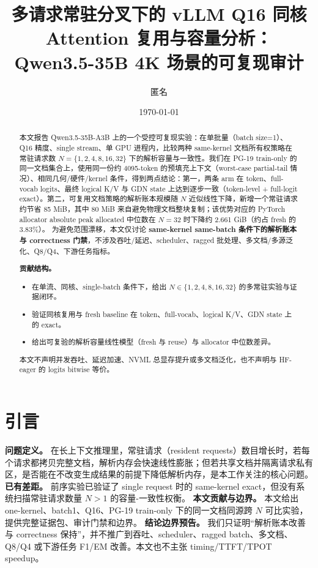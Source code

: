 \documentclass[11pt]{article}
\title{多请求常驻分叉下的 vLLM Q16 同核 Attention 复用与容量分析：\\
Qwen3.5-35B 4K 场景的可复现审计}
\author{匿名}
\date{\today}
\begin{document}
\maketitle

\begin{abstract}
本文报告 Qwen3.5-35B-A3B 上的一个受控可复现实验：在单批量（batch size=1）、Q16 精度、single stream、单 GPU 进程内，比较两种 same-kernel 文档所有权策略在常驻请求数
$N=\{1,2,4,8,16,32\}$ 下的解析容量与一致性。我们在 PG-19 train-only 的同一文档集合上，使用同一份约 4095-token 的预填充上下文（worst-case partial-tail 情况）、相同几何/硬件/kernel 条件，得到两点结论：第一，两条 arm 在 token、full-vocab logits、最终 logical K/V 与 GDN state 上达到逐步一致（token-level + full-logit exact）。第二，可复用文档策略的解析账本规模随 $N$ 近似线性下降，新增一个常驻请求约节省 85 MiB，其中 80 MiB 来自避免物理文档整块复制；该优势对应的 PyTorch allocator absolute peak allocated 中位数在 $N=32$ 时下降约 2.661 GiB（约占 fresh 的 3.83\%）。  
为避免范围漂移，本文仅讨论 \textbf{same-kernel same-batch 条件下的解析账本与 correctness 门禁}，不涉及吞吐/延迟、scheduler、ragged 批处理、多文档/多源泛化、Q8/Q4、下游任务指标。

\textbf{贡献结构。}
\begin{itemize}
  \item 在单流、同核、single-batch 条件下，给出 $N\in\{1,2,4,8,16,32\}$ 的多常驻实验与证据闭环。
  \item 验证同核复用与 fresh baseline 在 token、full-vocab、logical K/V、GDN state 上的 exact。
  \item 给出可复验的解析容量线性模型（fresh 与 reuse）与 allocator 中位数差异。
\end{itemize}
本文不声明并发吞吐、延迟加速、NVML 总显存提升或多文档泛化，也不声明与 HF-eager 的 logits bitwise 等价。
\end{abstract}

\section{引言}
\textbf{问题定义。} 在长上下文推理里，常驻请求（resident requests）数目增长时，若每个请求都拷贝完整文档，解析内存会快速线性膨胀；但若共享文档并隔离请求私有区，是否能在不改变生成结果的前提下降低解析内存，是本工作关注的核心问题。  
\textbf{已有差距。} 前序实验已验证了 single request 时的 same-kernel exact，但没有系统扫描常驻请求数量 $N>1$ 的容量-一致性权衡。  
\textbf{本文贡献与边界。} 本文给出 one-kernel、batch1、Q16、PG-19 train-only 下的同一文档同源跨 $N$ 可比实验，提供完整证据包、审计门禁和边界。  
\textbf{结论边界预告。} 我们只证明“解析账本改善与 correctness 保持”，并不推广到吞吐、scheduler、ragged batch、多文档、Q8/Q4 或下游任务 F1/EM 改善。本文也不主张 timing/TTFT/TPOT speedup。
\end{document}
